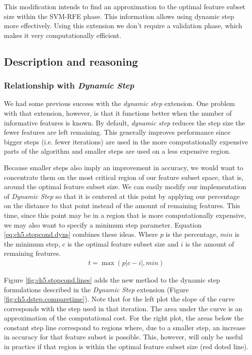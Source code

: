 This modification intends to find an approximation to the optimal feature subset size within the SVM-RFE phase. This information allows using dynamic step more effectively. Using this extension we don't require a validation phase, which makes it very computationally efficient.

\subsection{Description and reasoning}
\label{sec:ch5.stopcond.desc}

\subsubsection*{Relationship with \emph{Dynamic Step}}

We had some previous success with the \emph{dynamic step} extension. One problem with that extension, however, is that it functions better when the number of informative features is known. By default, \emph{dynamic step} reduces the step size the fewer features are left remaining. This generally improves performance since bigger steps (i.e. fewer iterations) are used in the more computationally expensive parts of the al\-go\-rithm and smaller steps are used on a less expensive region. 

Because smaller steps also imply an improvement in accuracy, we would want to concentrate them on the most critical region of our feature subset space, that is, around the optimal feature subset size. We can easily modify our implementation of \emph{Dynamic Step} so that it is centered at this point by applying our percentage on the distance to that point instead of the amount of remaining features. This time, since this point may be in a region that is more computationally expensive, we may also want to specify a minimum step parameter. Equation \ref{eq:ch5.stopcond.dyns} combines these ideas. Where $p$ is the percentage, $min$ is the minimum step, $c$ is the optimal feature subset size and $i$ is the amount of remaining features.
\begin{align}
    t = \max(p|c-i|, min)
    \label{eq:ch5.stopcond.dyns}
\end{align}

Figure \ref{fig:ch5.stopcond.lines} adds the new method to the dynamic step formulations described in the \emph{Dynamic Step} extension (Figure \ref{fig:ch5.dstep.comparetime}). Note that for the left plot the slope of the curve corresponds with the step used in that iteration. The area under the curve is an approximation of the computational cost. For the right plot, the areas below the constant step line correspond to regions where, due to a smaller step, an increase in accuracy for that feature subset is possible. This, however, will only be useful in practice if that region is within the optimal feature subset size (red doted line).

